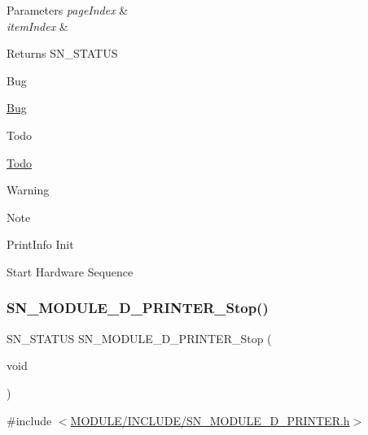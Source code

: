 \begin{DoxyParams}{Parameters}
{\em page\+Index} & \\
\hline
{\em item\+Index} & \\
\hline
\end{DoxyParams}
\begin{DoxyReturn}{Returns}
S\+N\+\_\+\+S\+T\+A\+T\+US 
\end{DoxyReturn}
\begin{DoxyRefDesc}{Bug}
\item[\hyperlink{bug__bug000004}{Bug}]\end{DoxyRefDesc}
\begin{DoxyRefDesc}{Todo}
\item[\hyperlink{todo__todo000004}{Todo}]\end{DoxyRefDesc}
\begin{DoxyWarning}{Warning}

\end{DoxyWarning}
\begin{DoxyNote}{Note}

\end{DoxyNote}
Print\+Info Init

Start Hardware Sequence \mbox{\label{group__PRINTER_ga21ca69a451fafe2c9218c9a1737e1f15}} 
\subsubsection{\texorpdfstring{S\+N\+\_\+\+M\+O\+D\+U\+L\+E\+\_\+D\+\_\+\+P\+R\+I\+N\+T\+E\+R\+\_\+\+Stop()}{SN\_MODULE\_3D\_PRINTER\_Stop()}}
{\footnotesize\ttfamily S\+N\+\_\+\+S\+T\+A\+T\+US S\+N\+\_\+\+M\+O\+D\+U\+L\+E\+\_\+D\+\_\+\+P\+R\+I\+N\+T\+E\+R\+\_\+\+Stop (\begin{DoxyParamCaption}\item[{void}]{ }\end{DoxyParamCaption})}



{\ttfamily \#include $<$\hyperlink{SN__MODULE__3D__PRINTER_8h}{M\+O\+D\+U\+L\+E/\+I\+N\+C\+L\+U\+D\+E/\+S\+N\+\_\+\+M\+O\+D\+U\+L\+E\+\_\+D\+\_\+\+P\+R\+I\+N\+T\+E\+R.\+h}$>$}


